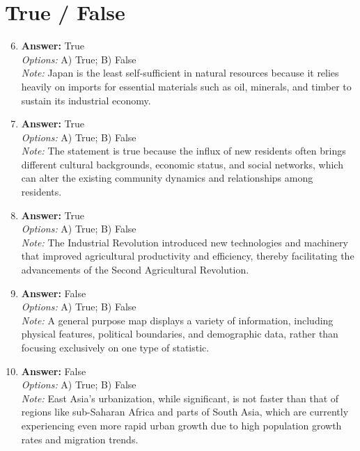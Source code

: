 \documentclass[12pt]{article}
\begin{document}
\section*{True / False}
\begin{enumerate}[label=\arabic*.]
\setcounter{enumi}{5}
\item \textbf{Answer:} True
\\ \textit{Options:} A) True; B) False
\\ \textit{Note:} Japan is the least self-sufficient in natural resources because it relies heavily on imports for essential materials such as oil, minerals, and timber to sustain its industrial economy.
\item \textbf{Answer:} True
\\ \textit{Options:} A) True; B) False
\\ \textit{Note:} The statement is true because the influx of new residents often brings different cultural backgrounds, economic status, and social networks, which can alter the existing community dynamics and relationships among residents.
\item \textbf{Answer:} True
\\ \textit{Options:} A) True; B) False
\\ \textit{Note:} The Industrial Revolution introduced new technologies and machinery that improved agricultural productivity and efficiency, thereby facilitating the advancements of the Second Agricultural Revolution.
\item \textbf{Answer:} False
\\ \textit{Options:} A) True; B) False
\\ \textit{Note:} A general purpose map displays a variety of information, including physical features, political boundaries, and demographic data, rather than focusing exclusively on one type of statistic.
\item \textbf{Answer:} False
\\ \textit{Options:} A) True; B) False
\\ \textit{Note:} East Asia's urbanization, while significant, is not faster than that of regions like sub-Saharan Africa and parts of South Asia, which are currently experiencing even more rapid urban growth due to high population growth rates and migration trends.
\end{enumerate}
\end{document}
